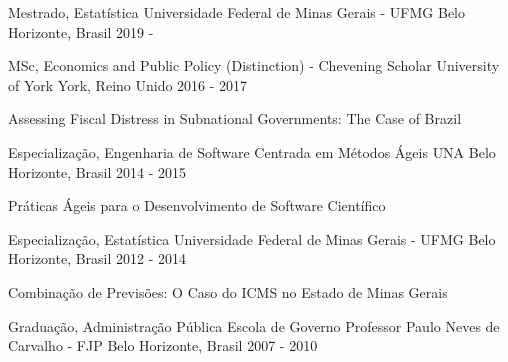\begin{cventries}
  \cventry
    {Mestrado, Estatística}
    {Universidade Federal de Minas Gerais - UFMG}
    {Belo Horizonte, Brasil}
    {2019 - }
    {
      \begin{cvitems}
      \end{cvitems}
    }
  \cventry
    {MSc, Economics and Public Policy (Distinction) - Chevening Scholar}
    {University of York}
    {York, Reino Unido}
    {2016 - 2017}
    {
      \begin{cvitems}
        \item {Assessing Fiscal Distress in Subnational Governments: The Case of Brazil}
      \end{cvitems}
    }
  \cventry
    {Especialização, Engenharia de Software Centrada em Métodos Ágeis}
    {UNA}
    {Belo Horizonte, Brasil}
    {2014 - 2015}
    {
      \begin{cvitems}
        \item {Práticas Ágeis para o Desenvolvimento de Software Científico}
      \end{cvitems}
    }
  \cventry
    {Especialização, Estatística}
    {Universidade Federal de Minas Gerais - UFMG}
    {Belo Horizonte, Brasil}
    {2012 - 2014}
    {
      \begin{cvitems}
        \item {Combinação de Previsões: O Caso do ICMS no Estado de Minas Gerais}
      \end{cvitems}
    }
  \cventry
    {Graduação, Administração Pública}
    {Escola de Governo Professor Paulo Neves de Carvalho - FJP}
    {Belo Horizonte, Brasil}
    {2007 - 2010}
    {
      \begin{cvitems}
      \end{cvitems}
    }
\end{cventries}
